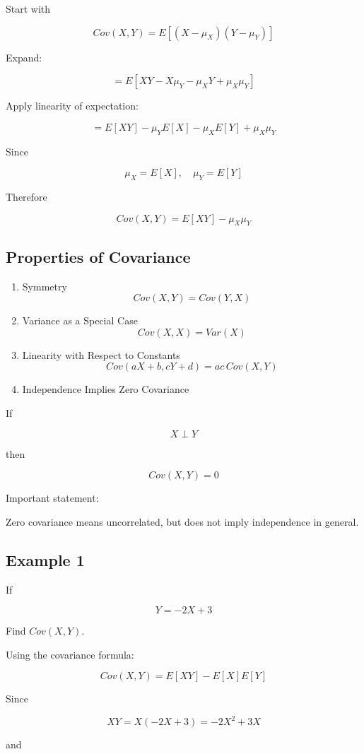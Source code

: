 \documentclass{article}
\begin{document}
Start with

\[
Cov(X,Y)=E[(X-\mu_X)(Y-\mu_Y)]
\]

Expand:

\[
=E[XY-X\mu_Y-\mu_XY+\mu_X\mu_Y]
\]

Apply linearity of expectation:

\[
=E[XY]-\mu_YE[X]-\mu_XE[Y]+\mu_X\mu_Y
\]

Since

\[
\mu_X=E[X], \quad \mu_Y=E[Y]
\]

Therefore

\[
Cov(X,Y)=E[XY]-\mu_X\mu_Y
\]

\subsection{Properties of Covariance}

\begin{enumerate}
\item Symmetry
\[
Cov(X,Y)=Cov(Y,X)
\]

\item Variance as a Special Case
\[
Cov(X,X)=Var(X)
\]

\item Linearity with Respect to Constants
\[
Cov(aX+b,cY+d)=ac\,Cov(X,Y)
\]

\item Independence Implies Zero Covariance
\end{enumerate}

If

\[
X \perp Y
\]

then

\[
Cov(X,Y)=0
\]

Important statement:

Zero covariance means uncorrelated, but does not imply independence in general.

\subsection{Example 1}

If

\[
Y=-2X+3
\]

Find $Cov(X,Y)$.

Using the covariance formula:

\[
Cov(X,Y)=E[XY]-E[X]E[Y]
\]

Since

\[
XY=X(-2X+3)=-2X^2+3X
\]

and
\end{document}
